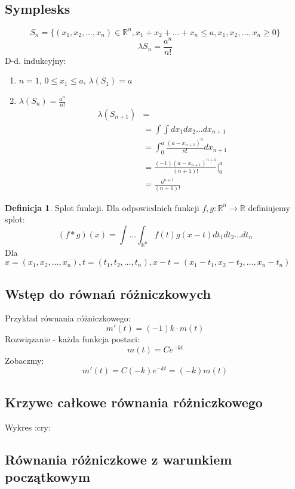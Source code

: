 \documentclass{article}
\theoremstyle{definition}
\newtheorem{de}{Definicja}[subsection]
\theoremstyle{definition}
\theoremstyle{definition}
\theoremstyle{definition}
\theoremstyle{definition}
\theoremstyle{definition}
\theoremstyle{definition}
\begin{document}
\subsection{Symplesks}

\[S_n=\{(x_1,x_2,\dots,x_n)\in\mathbb{R}^n, x_1+x_2+\dots+x_n\leq a, x_1,x_2,\dots,x_n\geq 0\}\]
\[\lambda{S_n}=\frac{a^n}{n!}\]
D-d. indukcyjny:
\begin{enumerate}
    \item $n=1$, $0\leq x_1\leq a$, $\lambda(S_1)=a$ 
    \item $\lambda(S_n)=\frac{a^n}{n!}$
    \begin{align}
        \lambda(S_{n+1})&=\\
        &= \int\int dx_1 dx_2\dots dx_{n+1}\\
        &= \int_{0}^{a} \frac{(a-x_{n+1})^n}{n!} dx_{n+1}\\
        &= \frac{(-1)(a-x_{n+1})^{n+1}}{(n+1)!}|_{0}^{a}\\
        &= \frac{a^{n+1}}{(n+1)!}
    \end{align}
\end{enumerate}

\begin{de}
    Splot funkcji. Dla odpowiednich funkcji $f,g:\mathbb{R}^n\rightarrow \mathbb{R}$
    definiujemy splot:
    \[(f*g)(x) = \int\dots\int_{\mathbb{R}^n} f(t)g(x-t) dt_1 dt_2 \dots dt_n\]
    Dla $x=(x_1,x_2,\dots,x_n), t=(t_1,t_2,\dots,t_n), x-t=(x_1-t_1,x_2-t_2,\dots,x_n-t_n)$
\end{de}

\subsection{Wstęp do równań różniczkowych}

Przykład równania różniczkowego:
\[m'(t)=(-1)k \cdot m(t)\]
Rozwiązanie - każda funkcja postaci:
\[m(t)=Ce^{-kt}\]
Zobaczmy:
\[m'(t)=C (-k) e^{-kt} = (-k) m(t)\]

\subsection{Krzywe całkowe równania różniczkowego}

Wykres :cry:

\subsection{Równania różniczkowe z warunkiem początkowym}
\end{document}
